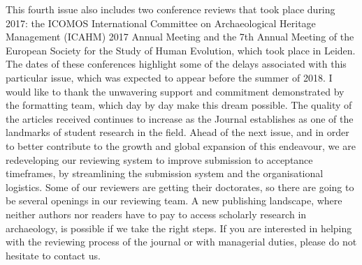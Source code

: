 This fourth issue also includes two conference reviews that took place during 2017: the ICOMOS International Committee on Archaeological Heritage Management (ICAHM) 2017 Annual Meeting and the 7th Annual Meeting of the European Society for the Study of Human Evolution, which took place in Leiden. The dates of these conferences highlight some of the delays associated with this particular issue, which was expected to appear before the summer of 2018. I would like to thank the unwavering support and commitment demonstrated by the formatting team, which day by day make this dream possible. The quality of the articles received continues to increase as the Journal establishes as one of the landmarks of student research in the field. Ahead of the next issue, and in order to better contribute to the growth and global expansion of this endeavour, we are redeveloping our reviewing system to improve submission to acceptance timeframes, by streamlining the submission system and the organisational logistics. Some of our reviewers are getting their doctorates, so there are going to be several openings in our reviewing team. A new publishing landscape, where neither authors nor readers have to pay to access scholarly research in archaeology, is possible if we take the right steps. If you are interested in helping with the reviewing process of the journal or with managerial duties, please do not hesitate to contact us.


\IJSRAclosing%
